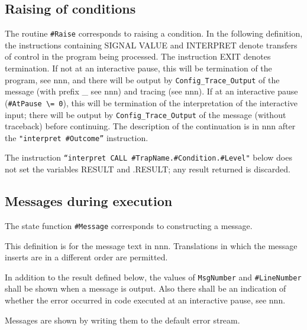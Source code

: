 \subsection{Raising of conditions}\label{raising-of-conditions}

The routine \texttt{\#Raise} corresponds to raising a condition. In the
following definition, the instructions containing SIGNAL VALUE and
INTERPRET denote transfers of control in the program being processed.
The instruction EXIT denotes termination. If not at an interactive
pause, this will be termination of the program, see nnn, and there will
be output by \texttt{Config\_Trace\_Output} of the message (with prefix
\_ see nnn) and tracing (see nnn). If at an interactive pause
(\texttt{\#AtPause\ \textbackslash{}=\ 0}), this will be termination of
the interpretation of the interactive input; there will be output by
\texttt{Config\_Trace\_Output} of the message (without traceback) before
continuing. The description of the continuation is in nnn after the
\texttt{"interpret\ \#Outcome”} instruction.

The instruction
\texttt{“interpret\ \textquotesingle{}CALL\textquotesingle{}\ \#TrapName.\#Condition.\#Level"}
below does not set the variables RESULT and .RESULT; any result returned
is discarded.



\subsection{Messages during execution}\label{messages-during-execution}

The state function \texttt{\#Message} corresponds to constructing a
message.

This definition is for the message text in nnn. Translations in which
the message inserts are in a different order are permitted.

In addition to the result defined below, the values of
\texttt{MsgNumber} and \texttt{\#LineNumber} shall be shown when a
message is output. Also there shall be an indication of whether the
error occurred in code executed at an interactive pause, see nnn.

Messages are shown by writing them to the default error stream.


